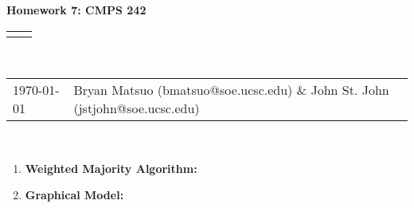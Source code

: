 \documentclass[12pt]{article}
\renewcommand{\title}[1]{\textbf{#1}\\}
\renewcommand{\line}{\begin{tabularx}{\textwidth}{X>{\raggedleft}X}\hline\\\end{tabularx}\\[-0.5cm]}
\newcommand{\leftright}[2]{\begin{tabularx}{\textwidth}{X>{\raggedleft}X}#1%
& #2\\\end{tabularx}\\[-0.5cm]}
\begin{document}
\title{Homework 7: CMPS 242}
\line
\leftright{\today}{Bryan Matsuo (bmatsuo@soe.ucsc.edu) \& John St. John (jstjohn@soe.ucsc.edu)} %
\begin{enumerate}
\item \textbf{Weighted Majority Algorithm:}


\item \textbf{Graphical Model:}

\end{enumerate}
\end{document}
